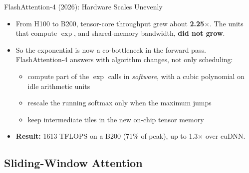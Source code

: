 \begin{frame}{FlashAttention-4 (2026): Hardware Scales Unevenly}
    \begin{itemize}\itemsep0.5em
        \item From H100 to B200, tensor-core throughput grew about \textbf{2.25$\times$}. The units that compute $\exp$, and shared-memory bandwidth, \textbf{did not grow}.
        \item So the exponential is now a co-bottleneck in the forward pass. FlashAttention-4 answers with algorithm changes, not only scheduling:
        \begin{itemize}\itemsep0.25em
            \item compute part of the $\exp$ calls in \emph{software}, with a cubic polynomial on idle arithmetic units
            \item rescale the running softmax only when the maximum jumps
            \item keep intermediate tiles in the new on-chip tensor memory
        \end{itemize}
        \item \textbf{Result:} 1613 TFLOPS on a B200 (71\% of peak), up to 1.3$\times$ over cuDNN.
    \end{itemize}
    \vspace{0.2em}
\end{frame}

\subsection{Sliding-Window Attention}

